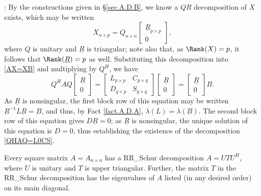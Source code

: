 \/: By the constructions given in \S \ref{sec.A.D.B}, we
know a $QR$ decomposition of $X$ exists, which may be written
\begin{equation*} X_{n\times p}=Q_{n\times n}\begin{bmatrix} \underline{R}_{p\times p} \\ 0 \end{bmatrix},
\end{equation*}
where $Q$ is unitary and $\underline{R}$ is triangular; note also
that, as $\Rank(X)=p$, it follows that $\Rank(\underline{R})=p$ as
well.  Substituting this decomposition into \eqref{AX=XB} and
multiplying by $Q^{H}$, we have
\begin{equation*}
Q^{H} A Q \begin{bmatrix} \underline{R} \\ 0 \end{bmatrix}
=\begin{bmatrix} L_{p\times p} & C_{p\times q} \\ D_{q\times p} & S_{q \times q} \end{bmatrix} \begin{bmatrix} \underline{R} \\ 0 \end{bmatrix}
=\begin{bmatrix} \underline{R} \\ 0 \end{bmatrix} B.
\end{equation*}
As $\underline{R}$ is nonsingular, the first block row of this
equation may be written $\underline{R}^{-1}L\underline{R}=B$, and
thus, by Fact \ref{fact.A.D.A}, $\lambda(L)=\lambda(B)$.  The second
block row of this equation gives $D \underline{R}=0$; as
$\underline{R}$ is nonsingular, the unique solution of this equation
is $D=0$, thus establishing the existence of the decomposition
\eqref{QHAQ=L0CS}.   \endproof

\begin{fact} \label{fact.A.D.C.Bb} Every square
matrix $A=A_{n\times n}$ has a RR_Schur decomposition $A=U T U^{H}$,
where $U$ is unitary and $T$ is upper triangular.  Further, the matrix
$T$ in the RR_Schur decomposition has the eigenvalues of $A$ listed (in
any desired order) on its main diagonal.
\end{fact}

